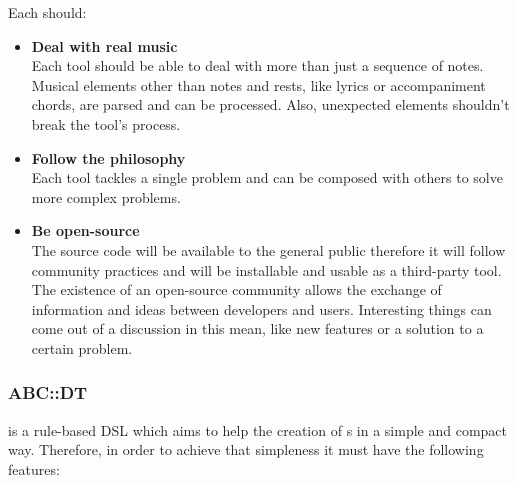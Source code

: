 
Each \abcpt{} should:

\begin{itemize}
  \item \textbf{Deal with real \abc{} music} \hfill\\
    Each tool should be able to deal with more than just a sequence of notes. Musical elements other
    than notes and rests, like lyrics or accompaniment chords, are parsed and can be processed.
    Also, unexpected elements shouldn't break the tool's process.
  \item \textbf{Follow the \unix{} philosophy} \hfill\\
    Each tool tackles a single problem and can be composed with others to solve more complex
    problems.
  \item \textbf{Be open-source} \hfill\\
    The source code will be available to the general public therefore it will follow community
    practices and will be installable and usable as a third-party tool. The existence of an
    open-source community allows the exchange of information and ideas between developers and users.
    Interesting things can come out of a discussion in this mean, like new features or a solution to
    a certain problem.
\end{itemize}

\subsubsection*{ABC::DT}

\abcdt{} is a rule-based \ac{DSL} which aims to help the creation of \abcpt{}s in a simple and
compact way. Therefore, in order to achieve that simpleness it must have the following features:

